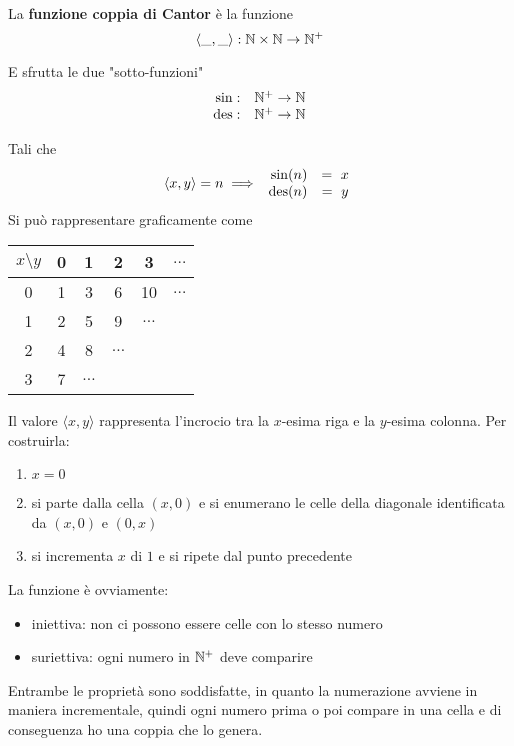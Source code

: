 La \textbf{funzione coppia di Cantor} è la funzione
$$ \langle \_ , \_ \rangle: \mathbb{N} \times \mathbb{N} \rightarrow \mathbb{N}^+ $$

E sfrutta le due "sotto-funzioni" 
$$
\begin{array}{r c}
	\sin: & \mathbb{N}^+ \rightarrow \mathbb{N} \\
	\operatorname{des}: & \mathbb{N}^+ \rightarrow \mathbb{N}
\end{array}
$$

Tali che 
$$ \langle x,y \rangle = n \implies \begin{array}{r c}
	\sin (n) & = \ x \\
	\operatorname{des} (n) & = \ y
\end{array}$$
Si può rappresentare graficamente come

\begin{center}
	\begin{minipage}[h]{0.45\textwidth}
		{\renewcommand{\arraystretch}{1.3}
			\begin{tabular}{c | c c c c c}
				$x\setminus y$ & 0 & 1 & 2 & 3 & $\dots$ \\ 
				\hline
				0 & 1 & 3 & 6 & 10 & $\dots$ \\
				1 & 2 & 5 & 9 & $\dots$ & \\
				2 & 4 & 8 & $\dots$ && \\
				3 & 7 & $\dots$ &&& \\
		\end{tabular}}
	\end{minipage}
	\hfill 
	\begin{minipage}[h]{0.45\textwidth}
		
	\end{minipage}
\end{center}

Il valore $\langle x,y \rangle$ rappresenta l'incrocio tra la $x$-esima riga e la $y$-esima colonna. Per costruirla:
\begin{enumerate}
	\item $x = 0$
    
	\item si parte dalla cella $(x,0)$ e si enumerano le celle della diagonale identificata da $(x,0)$ e $(0,x)$
	
    \item si incrementa $x$ di $1$ e si ripete dal punto precedente
\end{enumerate}

La funzione è ovviamente:
\begin{itemize}
	\item iniettiva: non ci possono essere celle con lo stesso numero
    
	\item suriettiva: ogni numero in $\mathbb{N}^+$ deve comparire
\end{itemize}
Entrambe le proprietà sono soddisfatte, in quanto la numerazione avviene in maniera incrementale, quindi ogni numero prima o poi compare in una cella e di conseguenza ho una coppia che lo genera.

